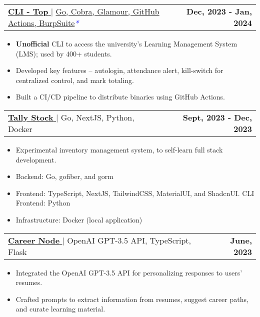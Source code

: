 \documentclass[letterpaper,11pt]{article}
\makeatletter
\newcommand{\uniformunderline}[1]{%
  \uline{\phantom{#1}}%
  \llap{\contour{white}{#1}}%
}
\newcommand{\resumeItem}[1]{
  \item\small{
    {#1 \vspace{-2pt}}
  }
}
\newcommand{\resumeProjectHeading}[2]{
    \item
    \begin{tabular*}{1.001\textwidth}{l@{\extracolsep{\fill}}r}
      \small#1 & \textbf{\small #2}\\
    \end{tabular*}\vspace{-7pt}
}
\newcommand{\resumeItemListStart}{\begin{itemize}}
\newcommand{\resumeItemListEnd}{\end{itemize}\vspace{-5pt}}
\makeatother
\begin{document}
        \resumeProjectHeading
            {\href{https://cli-top.acmvit.in}{\textbf{\large{CLI - Top}} \href{https://cli-top.acmvit.in}{\raisebox{-0.1\height}\faExternalLink }} $|$ \normalsize{\href{https://github.com/ACM-VIT/cli-top}{Go, Cobra, Glamour, GitHub Actions, BurpSuite}}\textcolor{blue}{\small{\textit{*}}}}{Dec, 2023 - Jan, 2024}
            \vspace{-11pt}
            \resumeItemListStart
                \resumeItem{\normalsize{\textbf{Unofficial} CLI to access the university's Learning Management System (LMS); used by 400+ students.}} 
                \resumeItem{\normalsize{Developed key features -- autologin, attendance alert, kill-switch for centralized control, and mark totaling.}}
                \resumeItem{\normalsize{Built a CI/CD pipeline to distribute binaries using GitHub Actions.}}
            \resumeItemListEnd
            \vspace{-15pt}
      
        \resumeProjectHeading
            {\href{https://github.com/saharshbhansali/TallyStock}{\textbf{\large{Tally Stock}} \href{https://github.com/saharshbhansali/TallyStock}{\raisebox{-0.1\height}\faExternalLink }} $|$ \normalsize{Go, NextJS, Python, Docker}}{Sept, 2023 - Dec, 2023}
            \vspace{-11pt}
            \resumeItemListStart
                \resumeItem{\normalsize{Experimental inventory management system, to self-learn full stack development.}} 
                \resumeItem{\normalsize{Backend: Go, gofiber, and gorm}} 
                \resumeItem{\normalsize{Frontend: TypeScript, NextJS, TailwindCSS, MaterialUI, and ShadcnUI. CLI Frontend: Python}}
                \resumeItem{\normalsize{Infrastructure: Docker (local application)}}
            \resumeItemListEnd
            \vspace{-15pt}

        \resumeProjectHeading
            {\href{https://github.com/kaushalrathi24/funtimeError}{\textbf{\large{Career Node}} \href{https://github.com/kaushalrathi24/funtimeError}{\raisebox{-0.1\height}\faExternalLink }} $|$ \normalsize{OpenAI GPT-3.5 API, TypeScript, Flask}}{June, 2023}
            \vspace{-11pt}
            \resumeItemListStart
                \resumeItem{\normalsize{Integrated the OpenAI GPT-3.5 API for personalizing responses to users' resumes.}} 
                \resumeItem{\normalsize{Crafted prompts to extract information from resumes, suggest career paths, and curate learning material.}} 
            \resumeItemListEnd 
            \vspace{-14pt}
\end{document}
